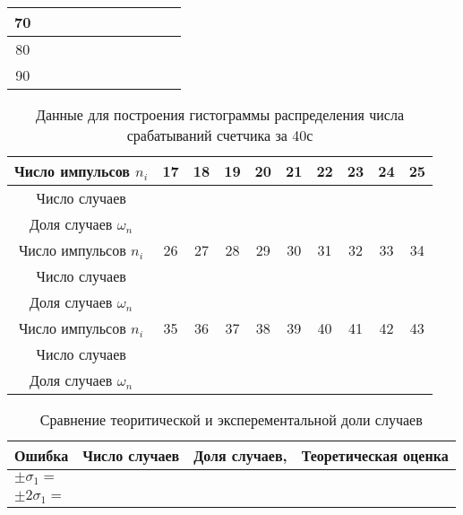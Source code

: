 \documentclass[a4paper,12pt]{article} %
\begin{document}
\begin{table}[h]
\begin{tabular}{|c|l|l|l|l|l|l|l|l|l|l|}
70      &                        &                        &                        &                        &                        &                        &                        &                        &                        &                         \\ \hline
80      &                        &                        &                        &                        &                        &                        &                        &                        &                        &                         \\ \hline
90      &                        &                        &                        &                        &                        &                        &                        &                        &                        &                         \\ \hline
\end{tabular}
\end{table}

\begin{table}[h!]
\renewcommand{\tabcolsep}{3mm}
\centering
\caption{Данные для построения гистограммы распределения числа срабатываний счетчика за 40с}
\label{table 4}
\begin{tabular}{|c|c|c|c|c|c|c|c|c|c|}
\hline
Число импульсов $n_i$ & 17 & 18 & 19 & 20 & 21 & 22  & 23 & 24 & 25\\ \hline
Число случаев   &   &   &   &   &   &  &	&	& \\ \hline
Доля случаев $\omega_n$   &   &   &   &   &   &  &	&	&  \\ \hline\hline
Число импульсов $n_i$ & 26 &27 & 28 & 29 & 30 & 31 & 32 &33 & 34\\ \hline
Число случаев   &   &   &   &   &   &  &	&	&   \\ \hline
Доля случаев $\omega_n$   &   &   &   &   &   &  &	&	&   \\ \hline\hline
Число импульсов $n_i$ & 35 &36 & 37 & 38 & 39 & 40 & 41 &42 & 43\\ \hline
Число случаев   &   &   &   &   &   &  &	&	&   \\ \hline
Доля случаев $\omega_n$   &   &   &   &   &   &  &	&	&   \\ \hline
\end{tabular}
\end{table}

\begin{table}[h!]
\renewcommand{\tabcolsep}{3mm}
\centering
\caption{Сравнение теоритической и эксперементальной доли случаев}
\label{table 5}
\begin{tabular}{|p{3cm}|c|c|p{3cm}|}
\hline
Ошибка & Число случаев & Доля случаев, & Теоретическая оценка\\ \hline
$\pm\sigma_1= $ & & &\\ \hline
$\pm2\sigma_1= $ & & &\\ \hline
\end{tabular}
\end{table}
\end{document}
